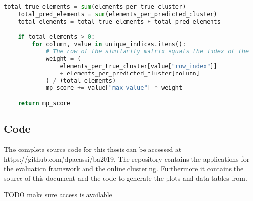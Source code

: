 \begin{lstlisting}[language=Python, caption=Calculate the MP-Score between two clusterings., label={lst:select_max_values}]
    total_true_elements = sum(elements_per_true_cluster)
    total_pred_elements = sum(elements_per_predicted_cluster)
    total_elements = total_true_elements + total_pred_elements

    if total_elements > 0:
        for column, value in unique_indices.items():
            # The row of the similarity matrix equals the index of the true cluster, while the column is the index of the predicted cluster
            weight = (
                elements_per_true_cluster[value["row_index"]]
                + elements_per_predicted_cluster[column]
            ) / (total_elements)
            mp_score += value["max_value"] * weight

    return mp_score
\end{lstlisting}

\subsection{Code}

The complete source code for this thesis can be accessed at https://github.com/dpacassi/ba2019. 
The repository contains the applications for the evaluation framework and the online clustering. 
Furthermore it contains the source of this document and the code to generate the plots and data tables from.

TODO make sure access is available
